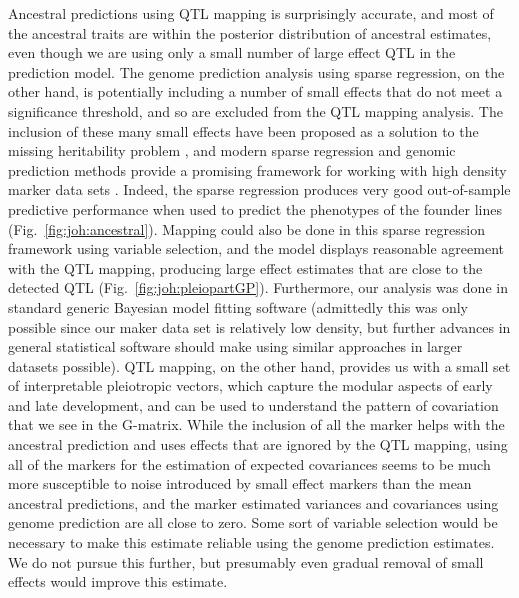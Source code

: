 \begin{refsection}
Ancestral predictions using QTL mapping is surprisingly accurate, and
most of the ancestral traits are within the posterior distribution of
ancestral estimates, even though we are using only a small number of
large effect QTL in the prediction model. The genome prediction analysis
using sparse regression, on the other hand, is potentially including a
number of small effects that do not meet a significance threshold, and
so are excluded from the QTL mapping analysis. The inclusion of these
many small effects have been proposed as a solution to the missing
heritability problem \parencite{Bloom2013-xc}, and modern sparse regression and genomic prediction
methods provide a promising framework for working with high density
marker data sets \parencite{Pong-Wong2014-vj}. Indeed, the sparse regression produces very good out-of-sample
predictive performance when used to predict the phenotypes of the
founder lines (Fig.~\ref{fig:joh:ancestral}). Mapping could also be done in this sparse
regression framework using variable selection, and the model displays
reasonable agreement with the QTL mapping, producing large effect
estimates that are close to the detected QTL (Fig.~\ref{fig:joh:pleiopartGP}). Furthermore, our
analysis was done in standard generic Bayesian model fitting software
(admittedly this was only possible since our maker data set is
relatively low density, but further advances in general statistical
software should make using similar approaches in larger datasets
possible). QTL mapping, on the other hand, provides us with a small set
of interpretable pleiotropic vectors, which capture the modular aspects
of early and late development, and can be used to understand the pattern
of covariation that we see in the G-matrix. While the inclusion of all
the marker helps with the ancestral prediction and uses effects that are
ignored by the QTL mapping, using all of the markers for the estimation
of expected covariances seems to be much more susceptible to noise
introduced by small effect markers than the mean ancestral predictions,
and the marker estimated variances and covariances using genome
prediction are all close to zero. Some sort of variable selection would
be necessary to make this estimate reliable using the genome prediction
estimates. We do not pursue this further, but presumably even gradual
removal of small effects would improve this estimate.


\end{refsection}
